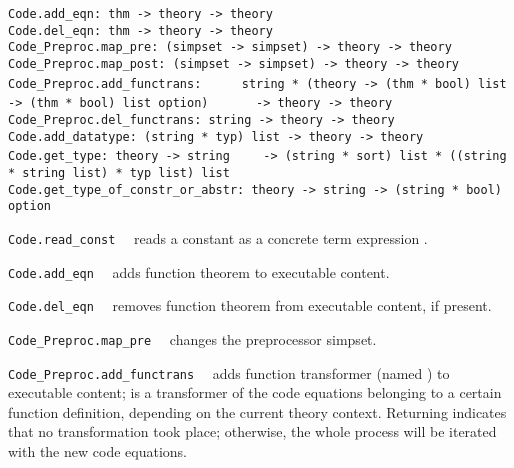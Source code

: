 \begin{isabellebody}
\begin{isamarkuptext}
\begin{mldecls}
  \verb|Code.add_eqn: thm -> theory -> theory| \\
  \verb|Code.del_eqn: thm -> theory -> theory| \\
  \verb|Code_Preproc.map_pre: (simpset -> simpset) -> theory -> theory| \\
  \verb|Code_Preproc.map_post: (simpset -> simpset) -> theory -> theory| \\
  \verb|Code_Preproc.add_functrans: |\isasep\isanewline%
\verb|    string * (theory -> (thm * bool) list -> (thm * bool) list option)|\isasep\isanewline%
\verb|      -> theory -> theory| \\
  \verb|Code_Preproc.del_functrans: string -> theory -> theory| \\
  \verb|Code.add_datatype: (string * typ) list -> theory -> theory| \\
  \verb|Code.get_type: theory -> string|\isasep\isanewline%
\verb|    -> (string * sort) list * ((string * string list) * typ list) list| \\
  \verb|Code.get_type_of_constr_or_abstr: theory -> string -> (string * bool) option|
  \end{mldecls}

  \begin{description}

  \item \verb|Code.read_const|~~
     reads a constant as a concrete term expression .

  \item \verb|Code.add_eqn|~~ adds function
     theorem  to executable content.

  \item \verb|Code.del_eqn|~~ removes function
     theorem  from executable content, if present.

  \item \verb|Code_Preproc.map_pre|~~ changes
     the preprocessor simpset.

  \item \verb|Code_Preproc.add_functrans|~~ adds
     function transformer  (named ) to executable content;
      is a transformer of the code equations belonging
     to a certain function definition, depending on the
     current theory context.  Returning  indicates that no
     transformation took place;  otherwise, the whole process will be iterated
     with the new code equations.


\end{description}
\end{isamarkuptext}
\end{isabellebody}
